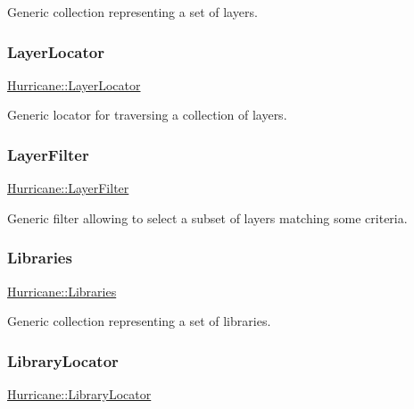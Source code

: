 Generic collection representing a set of layers. \mbox{\label{namespaceHurricane_a91a93ea29be3e6658d72f9bee0da8c7b}} 
\subsubsection{\texorpdfstring{Layer\+Locator}{LayerLocator}}
{\footnotesize\ttfamily \mbox{\hyperlink{namespaceHurricane_a91a93ea29be3e6658d72f9bee0da8c7b}{Hurricane\+::\+Layer\+Locator}}}

Generic locator for traversing a collection of layers. \mbox{\label{namespaceHurricane_a150e0e72c5c5609e0feb3311fa5bc127}} 
\subsubsection{\texorpdfstring{Layer\+Filter}{LayerFilter}}
{\footnotesize\ttfamily \mbox{\hyperlink{namespaceHurricane_a150e0e72c5c5609e0feb3311fa5bc127}{Hurricane\+::\+Layer\+Filter}}}

Generic filter allowing to select a subset of layers matching some criteria. \mbox{\label{namespaceHurricane_a2868a53bbb0507710460ff02fab77cad}} 
\subsubsection{\texorpdfstring{Libraries}{Libraries}}
{\footnotesize\ttfamily \mbox{\hyperlink{namespaceHurricane_a2868a53bbb0507710460ff02fab77cad}{Hurricane\+::\+Libraries}}}

Generic collection representing a set of libraries. \mbox{\label{namespaceHurricane_a0477ab8ee799bb25ce9521ac16dbb6b9}} 
\subsubsection{\texorpdfstring{Library\+Locator}{LibraryLocator}}
{\footnotesize\ttfamily \mbox{\hyperlink{namespaceHurricane_a0477ab8ee799bb25ce9521ac16dbb6b9}{Hurricane\+::\+Library\+Locator}}}

